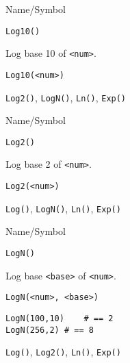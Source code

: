 \rl



\begin{desc}{Name/Symbol}
\item[Name/Symbol]	\verb+Log10()+

\item[Description]	Log base 10 of \verb+<num>+.

\item[Usage]
\begin{verbatim}
Log10(<num>)
\end{verbatim}

\item[Example]	

\item[See Also]	\verb+Log2()+, \verb+LogN()+, \verb+Ln()+, \verb+Exp()+
\end{desc}

\rl


\begin{desc}{Name/Symbol}
\item[Name/Symbol]	\verb+Log2()+

\item[Description]	Log base 2 of \verb+<num>+.

\item[Usage]
\begin{verbatim}
Log2(<num>)
\end{verbatim}

\item[Example]	

\item[See Also]	\verb+Log()+, \verb+LogN()+, \verb+Ln()+, \verb+Exp()+
\end{desc}

\rl


\begin{desc}{Name/Symbol}
\item[Name/Symbol]	\verb+LogN()+

\item[Description]	Log base \verb+<base>+ of \verb+<num>+.

\item[Usage]
\begin{verbatim}
LogN(<num>, <base>)
\end{verbatim}

\item[Example]
\begin{verbatim}
LogN(100,10)	# == 2
LogN(256,2)	# == 8
\end{verbatim}

\item[See Also]	\verb+Log()+, \verb+Log2()+, \verb+Ln()+, \verb+Exp()+
\end{desc}

